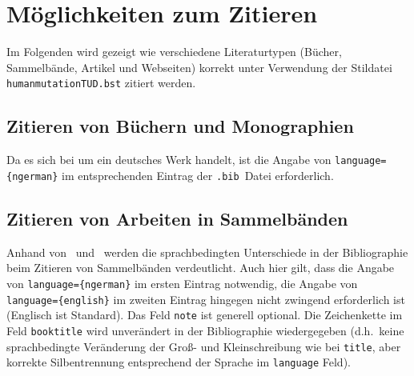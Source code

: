 \documentclass[a4paper,10pt]{scrartcl}
\begin{document}

\section{Möglichkeiten zum Zitieren}
Im Folgenden wird gezeigt wie verschiedene Literaturtypen (Bücher,
Sammelbände, Artikel und Webseiten) korrekt unter Verwendung der Stildatei
\verb|humanmutationTUD.bst| zitiert werden.
\subsection{Zitieren von Büchern und Monographien}
Da es sich bei  um ein deutsches Werk handelt, ist
die Angabe von \verb|language={ngerman}| im entsprechenden Eintrag der
\verb|.bib|~Datei erforderlich.


\subsection{Zitieren von Arbeiten in Sammelbänden}
Anhand von~ und~ werden
die sprachbedingten Unterschiede in der Bibliographie beim Zitieren von
Sammelb\"anden verdeutlicht. Auch hier gilt, dass die Angabe von
\verb|language={ngerman}| im ersten Eintrag notwendig, die Angabe von
\verb|language={english}| im zweiten Eintrag hingegen nicht zwingend
erforderlich ist (Englisch ist Standard). Das Feld \verb|note| ist generell
optional. Die Zeichenkette im Feld
\verb|booktitle| wird unverändert in der Bibliographie
wiedergegeben (d.h.\ keine sprachbedingte Veränderung der Gro{\ss}- und
Kleinschreibung wie bei
\verb|title|, aber korrekte Silbentrennung entsprechend der Sprache im
\verb|language| Feld).
\end{document}
